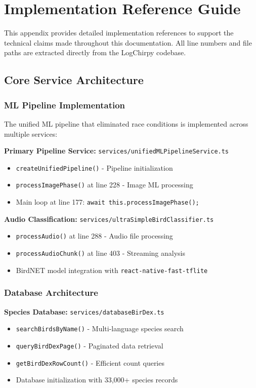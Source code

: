  \chapter{Implementation Reference Guide}
\label{appendix:implementation}

This appendix provides detailed implementation references to support the technical claims made throughout this documentation. All line numbers and file paths are extracted directly from the LogChirpy codebase.

\section{Core Service Architecture}

\subsection{ML Pipeline Implementation}

The unified ML pipeline that eliminated race conditions is implemented 
across multiple services:

\textbf{Primary Pipeline Service:} \texttt{services/\allowbreak unifiedMLPipelineService.ts}
\begin{itemize}
    \item \texttt{createUnifiedPipeline()} - Pipeline initialization
    \item \texttt{processImagePhase()} at line 228 - Image ML processing
    \item Main loop at line 177: \texttt{await this.processImagePhase();}
\end{itemize}

\textbf{Audio Classification:} \texttt{services/ultraSimpleBirdClassifier.ts}
\begin{itemize}
    \item \texttt{processAudio()} at line 288 - Audio file processing
    \item \texttt{processAudioChunk()} at line 403 - Streaming analysis
    \item BirdNET model integration with \texttt{react-native-fast-tflite}
\end{itemize}

\subsection{Database Architecture}

\textbf{Species Database:} \texttt{services/databaseBirDex.ts}
\begin{itemize}
    \item \texttt{searchBirdsByName()} - Multi-language species search
    \item \texttt{queryBirdDexPage()} - Paginated data retrieval
    \item \texttt{getBirdDexRowCount()} - Efficient count queries
    \item Database initialization with 33,000+ species records
\end{itemize}

